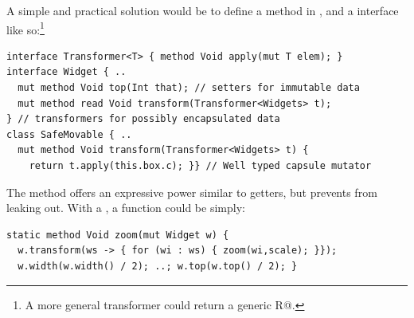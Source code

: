 A simple and practical solution would be to define a \Q@transform@ method in \Q@Widget@, and a \Q@Transformer@ interface 
like so:\footnote{A more general transformer could return a generic \Q@read R@.}
\saveSpace
\begin{lstlisting}
interface Transformer<T> { method Void apply(mut T elem); }
interface Widget { ..
  mut method Void top(Int that); // setters for immutable data
  mut method read Void transform(Transformer<Widgets> t);
} // transformers for possibly encapsulated data
class SafeMovable { ..
  mut method Void transform(Transformer<Widgets> t) {
    return t.apply(this.box.c); }} // Well typed capsule mutator
\end{lstlisting}\saveSpace
The \Q@transform@ method offers an expressive power similar to \Q@mut@ getters, but prevents \Q@Widgets@ from leaking out.  With a \Q@Transformer@, a \Q@zoom@ function could be simply:
\saveSpace\begin{lstlisting}
static method Void zoom(mut Widget w) {
  w.transform(ws -> { for (wi : ws) { zoom(wi,scale); }});
  w.width(w.width() / 2); ..; w.top(w.top() / 2); }
\end{lstlisting}\saveSpace
\saveSpace
\saveSpace



